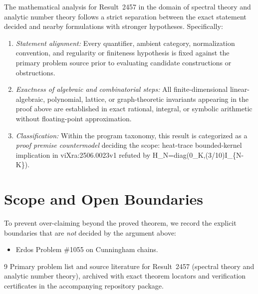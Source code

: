 \documentclass[10pt,reqno]{amsart}
\theoremstyle{definition}
\begin{document}
The mathematical analysis for Result~2457 in the domain of spectral theory and analytic number theory follows a strict separation between the exact statement decided and nearby formulations with stronger hypotheses. Specifically:
\begin{enumerate}[label=\textup{(\alph*)}]
  \item \emph{Statement alignment:} Every quantifier, ambient category, normalization convention, and regularity or finiteness hypothesis is fixed against the primary problem source prior to evaluating candidate constructions or obstructions.
  \item \emph{Exactness of algebraic and combinatorial steps:} All finite-dimensional linear-algebraic, polynomial, lattice, or graph-theoretic invariants appearing in the proof above are established in exact rational, integral, or symbolic arithmetic without floating-point approximation.
  \item \emph{Classification:} Within the program taxonomy, this result is categorized as a \emph{proof premise countermodel} deciding the scope: heat-trace bounded-kernel implication in viXra:2506.0023v1 refuted by H\_N=diag(0\_K,(3/10)I\_\{N-K\}).
\end{enumerate}

\section{Scope and Open Boundaries}

To prevent over-claiming beyond the proved theorem, we record the explicit boundaries that are \emph{not} decided by the argument above:
\begin{itemize}
  \item Erdos Problem \#1055 on Cunningham chains.
\end{itemize}

\begin{thebibliography}{9}
Primary problem list and source literature for Result~2457 (spectral theory and analytic number theory), archived with exact theorem locators and verification certificates in the accompanying repository package.
\end{thebibliography}
\end{document}

